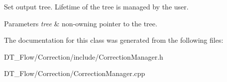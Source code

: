 Set output tree. Lifetime of the tree is managed by the user. 


\begin{DoxyParams}{Parameters}
{\em tree} & non-\/owning pointer to the tree. \\
\hline
\end{DoxyParams}


The documentation for this class was generated from the following files\+:\begin{DoxyCompactItemize}
\item 
D\+T\+\_\+\+Flow/\+Correction/include/Correction\+Manager.\+h\item 
D\+T\+\_\+\+Flow/\+Correction/Correction\+Manager.\+cpp\end{DoxyCompactItemize}
